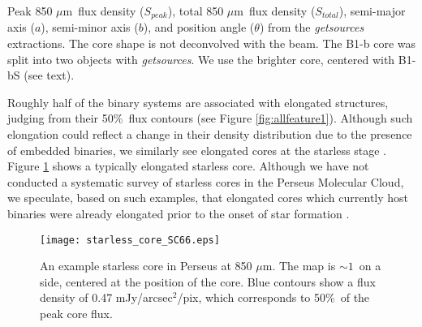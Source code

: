 \documentclass[usenatbib,a4paper]{mnras}
\newcommand{\mJyarcsec}{\mbox{mJy/arcsec$^{2}$/pix}}%
\newcommand{\um}{\mbox{$\mu$m}}%
\begin{document}
\begin{table*}
\begin{threeparttable}
\begin{tablenotes}
\item {} Peak 850 \um\ flux density ($S_{peak}$), total 850 \um\ flux density ($S_{total}$), semi-major axis ($a$), semi-minor axis ($b$), and position angle ($\theta$) from the \emph{getsources} extractions.  The core shape is not deconvolved with the beam.  The B1-b core was split into two objects with \emph{getsources}. We use the brighter core, centered with B1-bS (see text).
\end{tablenotes}
\end{threeparttable}
\end{table*}	

Roughly half of the binary systems are associated with elongated structures, judging from their 50\%\ flux contours (see Figure \ref{fig:allfeature1}).  Although such elongation could reflect a change in their density distribution due to the presence of embedded binaries, we similarly see elongated cores at the starless stage \citep[e.g., see Figure 13 in][]{Enoch06}.  Figure \ref{starless} shows a typically elongated starless core.  Although we have not conducted a systematic survey of starless cores in the Perseus Molecular Cloud, we speculate, based on such examples, that elongated cores which currently host binaries were already elongated prior to the onset of star formation \citep[e.g.,][]{Myers91}.   

\begin{figure}
\texttt{[image: starless\_core\_SC66.eps]}
\caption{An example starless core in Perseus at 850 \um.  The map is $\sim 1$\arcmin\ on a side, centered at the position of the core.  Blue contours show a flux density of 0.47 \mJyarcsec, which corresponds to 50\%\ of the peak core flux.\label{starless}}
\end{figure}
\end{document}
